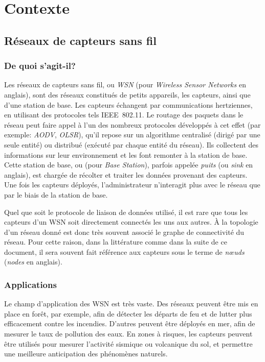 \section{Contexte}
\label{st:sec:contexte}
    \subsection{Réseaux de capteurs sans fil}

        \subsubsection{De quoi s'agit-il?}
Les réseaux de capteurs sans fil, ou \textit{WSN} (pour \textit{Wireless Sensor Networks} en anglais), sont des réseaux constitués de petits appareils, les capteurs, ainsi que d'une station de base.
Les capteurs échangent par communications hertziennes, en utilisant des protocoles tels IEEE~802.11.
Le routage des paquets dans le réseau peut faire appel à l'un des nombreux protocoles développés à cet effet (par exemple: \textit{AODV}, \textit{OLSR}), qu'il repose sur un algorithme centralisé (dirigé par une seule entité) ou distribué (exécuté par chaque entité du réseau).
Ils collectent des informations sur leur environnement et les font remonter à la station de base.
Cette station de base, ou \BS (pour \textit{Base Station}), parfois appelée \textit{puits} (ou \textit{sink} en anglais), est chargée de récolter et traiter les données provenant des capteurs.
Une fois les capteurs déployés, l'administrateur n'interagit plus avec le réseau que par le biais de la station de base.

Quel que soit le protocole de liaison de données utilisé, il est rare que tous les capteurs d'un WSN soit directement connectés les uns aux autres.
À la topologie d'un réseau donné est donc très souvent associé le graphe de connectivité du réseau.
Pour cette raison, dans la littérature comme dans la suite de ce document, il sera souvent fait référence aux capteurs sous le terme de \textit{nœuds} (\textit{nodes} en anglais).

        \subsubsection{Applications}
Le champ d'application des WSN est très vaste.
Des réseaux peuvent être mis en place en forêt, par exemple, afin de détecter les départs de feu et de lutter plus efficacement contre les incendies.
D'autres peuvent être déployés en mer, afin de mesurer le taux de pollution des eaux.
En zones à risques, les capteurs peuvent être utilisés pour mesurer l'activité sismique ou volcanique du sol, et permettre une meilleure anticipation des phénomènes naturels.

